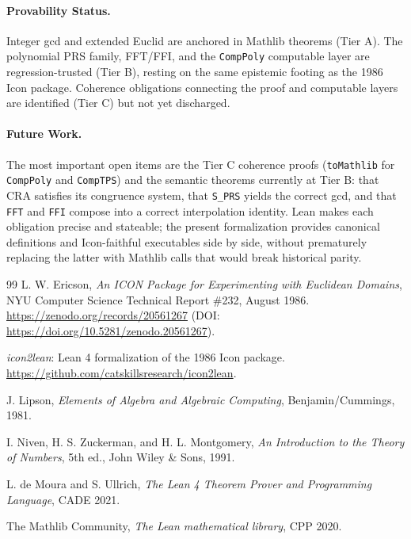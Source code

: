 \documentclass[11pt,a4paper]{article}
\begin{document}
\paragraph{Provability Status.} Integer gcd and extended Euclid are anchored in Mathlib theorems (Tier A). The polynomial PRS family, FFT/FFI, and the \texttt{CompPoly} computable layer are regression-trusted (Tier B), resting on the same epistemic footing as the 1986 Icon package. Coherence obligations connecting the proof and computable layers are identified (Tier C) but not yet discharged.

\paragraph{Future Work.} The most important open items are the Tier C coherence proofs (\texttt{toMathlib} for \texttt{CompPoly} and \texttt{CompTPS}) and the semantic theorems currently at Tier B: that CRA satisfies its congruence system, that \texttt{S\_PRS} yields the correct gcd, and that \texttt{FFT} and \texttt{FFI} compose into a correct interpolation identity. Lean makes each obligation precise and stateable; the present formalization provides canonical definitions and Icon-faithful executables side by side, without prematurely replacing the latter with Mathlib calls that would break historical parity.

\begin{thebibliography}{99}
L. W. Ericson, \emph{An ICON Package for Experimenting with Euclidean Domains}, NYU Computer Science Technical Report \#232, August 1986. \url{https://zenodo.org/records/20561267} (DOI: \url{https://doi.org/10.5281/zenodo.20561267}).

\emph{icon2lean}: Lean 4 formalization of the 1986 Icon package. \url{https://github.com/catskillsresearch/icon2lean}.

J. Lipson, \emph{Elements of Algebra and Algebraic Computing}, Benjamin/Cummings, 1981.

I. Niven, H. S. Zuckerman, and H. L. Montgomery, \emph{An Introduction to the Theory of Numbers}, 5th ed., John Wiley \& Sons, 1991.

L. de Moura and S. Ullrich, \emph{The Lean 4 Theorem Prover and Programming Language}, CADE 2021.

The Mathlib Community, \emph{The Lean mathematical library}, CPP 2020.
\end{thebibliography}
\end{document}
